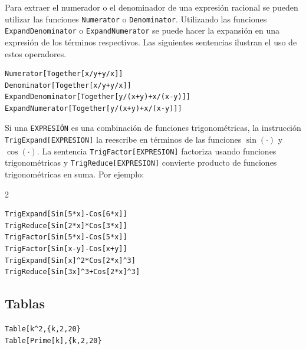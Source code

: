 Para extraer el numerador o el denominador de una expresión racional se pueden utilizar
las funciones \verb"Numerator" o \verb"Denominator".
Utilizando las funciones \verb"ExpandDenominator" o \verb"ExpandNumerator"
se puede hacer la expansión en una expresión de los términos respectivos.
Las siguientes sentencias ilustran el uso de estos operadores.
   
\begin{tcolorbox}[title=Usos de \verb"ExpandDenominator" y \verb"ExpandNumerator"]
\begin{Verbatim}[formatcom=\letraverbatim]
Numerator[Together[x/y+y/x]]
Denominator[Together[x/y+y/x]]
ExpandDenominator[Together[y/(x+y)+x/(x-y)]]
ExpandNumerator[Together[y/(x+y)+x/(x-y)]]
\end{Verbatim}
\end{tcolorbox}

  
Si una \verb"EXPRESIÓN" es una combinación de funciones trigonométricas, la instrucción
\verb"TrigExpand[EXPRESION]" la reescribe en términos de las funciones $\sin(\cdot)$ y $\cos(\cdot)$.
La sentencia \verb"TrigFactor[EXPRESION]" factoriza usando funciones trigonométricas y
\verb"TrigReduce[EXPRESION]" convierte producto de funciones trigonométricas en suma.
Por ejemplo:

\begin{tcolorbox}
  \begin{multicols}{2}
\begin{Verbatim}[formatcom=\letraverbatim]
TrigExpand[Sin[5*x]-Cos[6*x]]
TrigReduce[Sin[2*x]*Cos[3*x]]
TrigFactor[Sin[5*x]-Cos[5*x]]
TrigFactor[Sin[x-y]-Cos[x+y]]
TrigExpand[Sin[x]^2*Cos[2*x]^3]
TrigReduce[Sin[3x]^3+Cos[2*x]^3]
\end{Verbatim}
  \end{multicols}
\end{tcolorbox}

\subsection{Tablas}

\begin{tcolorbox}
  \verb"Table[k^2,{k,2,20}"\\
    \verb"Table[Prime[k],{k,2,20}"
    \end{tcolorbox}

